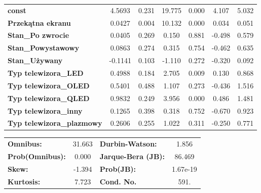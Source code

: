 \documentclass[11pt,a4paper]{article}
\begin{document}
\begin{center}
\begin{tabular}{lcccccc}
				\textbf{const}                    &       4.5693  &        0.231     &    19.775  &         0.000        &        4.107    &        5.032     \\
				\textbf{Przekątna ekranu}         &       0.0427  &        0.004     &    10.132  &         0.000        &        0.034    &        0.051     \\
				\textbf{Stan\_Po zwrocie}         &       0.0405  &        0.269     &     0.150  &         0.881        &       -0.498    &        0.579     \\
				\textbf{Stan\_Powystawowy}        &       0.0863  &        0.274     &     0.315  &         0.754        &       -0.462    &        0.635     \\
				\textbf{Stan\_Używany}            &      -0.1141  &        0.103     &    -1.110  &         0.272        &       -0.320    &        0.092     \\
				\textbf{Typ telewizora\_LED}      &       0.4988  &        0.184     &     2.705  &         0.009        &        0.130    &        0.868     \\
				\textbf{Typ telewizora\_OLED}     &       0.5401  &        0.488     &     1.107  &         0.273        &       -0.436    &        1.516     \\
				\textbf{Typ telewizora\_QLED}     &       0.9832  &        0.249     &     3.956  &         0.000        &        0.486    &        1.481     \\
				\textbf{Typ telewizora\_inny}     &       0.1265  &        0.398     &     0.318  &         0.752        &       -0.670    &        0.923     \\
				\textbf{Typ telewizora\_plazmowy} &       0.2606  &        0.255     &     1.022  &         0.311        &       -0.250    &        0.771     \\
				 
			\end{tabular}
			\begin{tabular}{lclc}
				\textbf{Omnibus:}       & 31.663 & \textbf{  Durbin-Watson:     } &    1.856  \\
				\textbf{Prob(Omnibus):} &  0.000 & \textbf{  Jarque-Bera (JB):  } &   86.469  \\
				\textbf{Skew:}          & -1.394 & \textbf{  Prob(JB):          } & 1.67e-19  \\
				\textbf{Kurtosis:}      &  7.723 & \textbf{  Cond. No.          } &     591.  \\
				 
			\end{tabular}
		\end{center}
	
\end{document}
